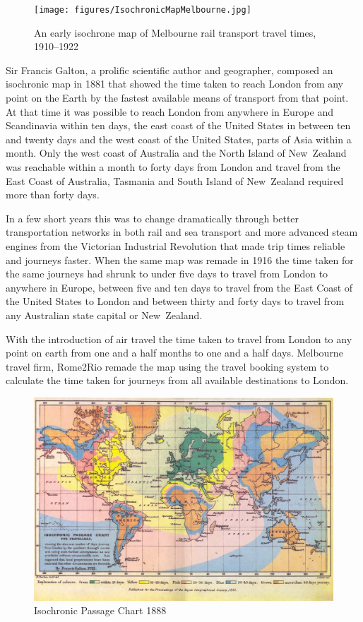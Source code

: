 \begin{figure}
\centering
\texttt{[image: figures/IsochronicMapMelbourne.jpg]}
\caption{An early isochrone map of Melbourne rail transport travel times, 1910--1922\cite{RefWorks:311}}
\end{figure}

Sir Francis Galton, a prolific scientific author and geographer, composed an isochronic map in 1881 that showed the time taken to reach London from any point on the Earth by the fastest available means of transport from that point. At that time it was possible to reach London from anywhere in Europe and Scandinavia within ten days, the east coast of the United States in between ten and twenty days and the west coast of the United States, parts of Asia within a month. Only the west coast of Australia and the North Island of New~Zealand was reachable within a month to forty days from London and travel from the East Coast of Australia, Tasmania and South Island of New~Zealand required more than forty days.

In a few short years this was to change dramatically through better transportation networks in both rail and sea transport and more advanced steam engines from the Victorian Industrial Revolution that made trip times reliable and journeys faster. When the same map was remade in 1916 the time taken for the same journeys had shrunk to under five days to travel from London to anywhere in Europe, between five and ten days to travel from the East Coast of the United States to London and between thirty and forty days to travel from any Australian state capital or New~Zealand.

With the introduction of air travel the time taken to travel from London to any point on earth from one and a half months to one and a half days. Melbourne travel firm, Rome2Rio remade the map using the travel booking system to calculate the time taken for journeys from all available destinations to London.
\begin{figure}
\centering
\includegraphics[scale=0.25]{figures/IsochronicPassageChart.jpg}
\caption{Isochronic Passage Chart 1888\cite{RefWorks:310}}
\end{figure}


